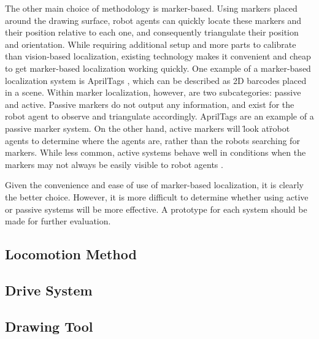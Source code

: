 The other main choice of methodology is marker-based. Using markers placed around the drawing surface, robot agents can quickly locate these markers and their position relative to each one, and consequently triangulate their position and orientation. While requiring additional setup and more parts to calibrate than vision-based localization, existing technology makes it convenient and cheap to get marker-based localization working quickly. One example of a marker-based localization system is AprilTags , which can be described as 2D barcodes placed in a scene. Within marker localization, however, are two subcategories: passive and active. Passive markers do not output any information, and exist for the robot agent to observe and triangulate accordingly. AprilTags are an example of a passive marker system. On the other hand, active markers will \"look at\" robot agents to determine where the agents are, rather than the robots searching for markers. While less common, active systems behave well in conditions when the markers may not always be easily visible to robot agents .

Given the convenience and ease of use of marker-based localization, it is clearly the better choice. However, it is more difficult to determine whether using active or passive systems will be more effective. A prototype for each system should be made for further evaluation.


\subsection{Locomotion Method}

\subsection{Drive System}

\subsection{Drawing Tool}
